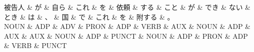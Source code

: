 \documentclass[tikz,border=5pt]{standalone}
\begin{document}
\normalsize
\begin{dependency}[edge unit distance=12.0pt]
    \begin{deptext}[column sep=1em]
        被告人 \& が \& 自ら \& これ \& を \& 依頼 \& する \& こと \& が \& でき \& ない \& とき \& は \& 、 \& 国 \& で \& これ \& を \& 附する \& 。\\
        NOUN \& ADP \& ADV \& PRON \& ADP \& VERB \& AUX \& NOUN \& ADP \& AUX \& AUX \& NOUN \& ADP \& PUNCT \& NOUN \& ADP \& PRON \& ADP \& VERB \& PUNCT\\
    \end{deptext}
\end{dependency}
\end{document}

